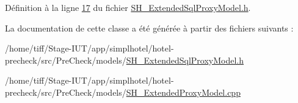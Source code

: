 Définition à la ligne \hyperlink{SH__ExtendedSqlProxyModel_8h_source_l00017}{17} du fichier \hyperlink{SH__ExtendedSqlProxyModel_8h_source}{S\-H\-\_\-\-Extended\-Sql\-Proxy\-Model.\-h}.



La documentation de cette classe a été générée à partir des fichiers suivants \-:\begin{DoxyCompactItemize}
\item 
/home/tiff/\-Stage-\/\-I\-U\-T/app/simplhotel/hotel-\/precheck/src/\-Pre\-Check/models/\hyperlink{SH__ExtendedSqlProxyModel_8h}{S\-H\-\_\-\-Extended\-Sql\-Proxy\-Model.\-h}\item 
/home/tiff/\-Stage-\/\-I\-U\-T/app/simplhotel/hotel-\/precheck/src/\-Pre\-Check/models/\hyperlink{SH__ExtendedProxyModel_8cpp}{S\-H\-\_\-\-Extended\-Proxy\-Model.\-cpp}\end{DoxyCompactItemize}
